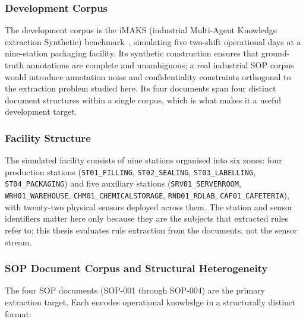 \documentclass[11pt]{article}
\begin{document}
\subsubsection{Development Corpus}
The development corpus is the iMAKS (industrial Multi-Agent Knowledge extraction
Synthetic) benchmark~\cite{bernardini2026imaks}, simulating five two-shift
operational days at a nine-station packaging facility. Its synthetic construction
ensures that ground-truth annotations are complete and unambiguous; a real
industrial SOP corpus would introduce annotation noise and confidentiality
constraints orthogonal to the extraction problem studied here. Its four documents
span four distinct document structures within a single corpus, which is what
makes it a useful development target.

\subsubsection{Facility Structure}
The simulated facility consists of nine stations organised into six zones:
four production stations (\texttt{ST01\_FILLING}, \texttt{ST02\_SEALING},
\texttt{ST03\_LABELLING}, \texttt{ST04\_PACKAGING}) and five auxiliary stations
(\texttt{SRV01\_SERVERROOM}, \texttt{WRH01\_WAREHOUSE},
\texttt{CHM01\_CHEMICALSTORAGE}, \texttt{RND01\_RDLAB}, \texttt{CAF01\_CAFETERIA}),
with twenty-two physical sensors deployed across them. The station and sensor
identifiers matter here only because they are the subjects that extracted rules
refer to; this thesis evaluates rule extraction from the documents, not the
sensor stream.

\subsubsection{SOP Document Corpus and Structural Heterogeneity}
\label{sec:sop_corpus}
The four SOP documents (SOP-001 through SOP-004) are the primary extraction target.
Each encodes operational knowledge in a structurally distinct format:
\end{document}
